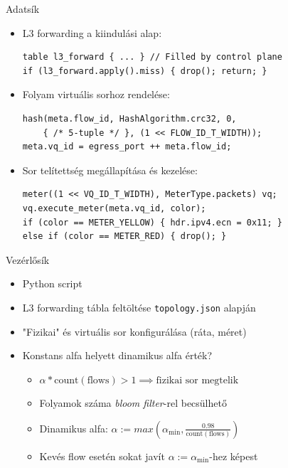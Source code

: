 \documentclass{beamer}
\begin{document}
\begin{frame}[containsverbatim]{Adatsík}
\begin{itemize}
    \item L3 forwarding a kiindulási alap:
\begin{verbatim}
table l3_forward { ... } // Filled by control plane
if (l3_forward.apply().miss) { drop(); return; }
\end{verbatim}
    
    \item Folyam virtuális sorhoz rendelése:
\begin{verbatim}
hash(meta.flow_id, HashAlgorithm.crc32, 0,
    { /* 5-tuple */ }, (1 << FLOW_ID_T_WIDTH));
meta.vq_id = egress_port ++ meta.flow_id;
\end{verbatim}

    \item Sor telítettség megállapítása és kezelése:
\begin{verbatim}
meter((1 << VQ_ID_T_WIDTH), MeterType.packets) vq;
vq.execute_meter(meta.vq_id, color);
if (color == METER_YELLOW) { hdr.ipv4.ecn = 0x11; }
else if (color == METER_RED) { drop(); }
\end{verbatim}
\end{itemize}
\end{frame}

\begin{frame}[containsverbatim]{Vezérlősík}
\begin{itemize}
    \item Python script
    \item L3 forwarding tábla feltöltése \texttt{topology.json} alapján
    \item "Fizikai" és virtuális sor konfigurálása (ráta, méret)
    \item Konstans alfa helyett dinamikus alfa érték?
    \begin{itemize}
        \item $\alpha * \text{count}(\text{flows}) > 1 \implies \text{fizikai sor megtelik}$
        \item Folyamok száma \textit{bloom filter}-rel becsülhető
        \item Dinamikus alfa: $\alpha := max(\alpha_\text{min}, \frac{0.98}{\text{count}(\text{flows})})$
        \item Kevés flow esetén sokat javít $\alpha := \alpha_\text{min}$-hez képest
    \end{itemize}
\end{itemize}
\end{frame}
\end{document}
